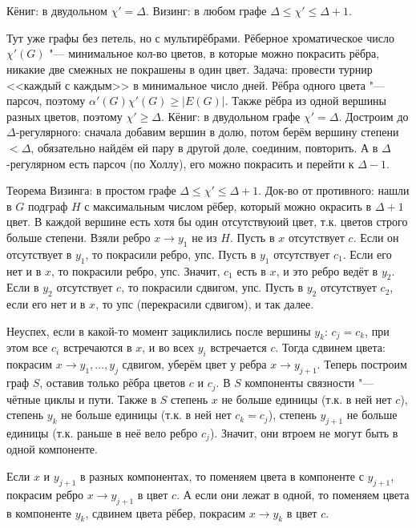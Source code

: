 \section{} %
	Кёниг: в двудольном $\chi'=\Delta$.
	Визинг: в любом графе $\Delta \le \chi' \le \Delta+1$.

	Тут уже графы без петель, но с мультирёбрами.
	Рёберное хроматическое число $\chi'(G)$ "--- минимальное кол-во цветов, в которые можно покрасить рёбра,
	никакие две смежных не покрашены в один цвет.
	Задача: провести турнир <<каждый с каждым>> в минимальное число дней.
	Рёбра одного цвета "--- парсоч, поэтому $\alpha'(G)\chi'(G) \ge |E(G)|$.
	Также рёбра из одной вершины разных цветов, поэтому $\chi' \ge \Delta$.
	Кёниг: в двудольном графе $\chi' = \Delta$.
	Достроим до $\Delta$-регулярного: сначала добавим вершин в долю, потом берём вершину степени $<\Delta$,
	обязательно найдём ей пару в другой доле, соединим, повторить.
	А в $\Delta$-регулярном есть парсоч (по Холлу), его можно покрасить и перейти к $\Delta-1$.

	Теорема Визинга: в простом графе $\Delta \le \chi' \le \Delta + 1$.
	Док-во от противного: нашли в $G$ подграф $H$ с максимальным числом рёбер, который можно окрасить в $\Delta+1$ цвет.
	В каждой вершине есть хотя бы один отсутствуюий цвет, т.к. цветов строго больше степени.
	Взяли ребро $x\to y_1$ не из $H$.
	Пусть в $x$ отсутствует $c$.
	Если он отсутствует в $y_1$, то покрасили ребро, упс.
	Пусть в $y_1$ отсутствует $c_1$.
	Если его нет и в $x$, то покрасили ребро, упс.
	Значит, $c_1$ есть в $x$, и это ребро ведёт в $y_2$.
	Если в $y_2$ отсутствует $c$, то покрасили сдвигом, упс.
	Пусть в $y_2$ отсутствует $c_2$, если его нет и в $x$, то упс (перекрасили сдвигом), и так далее.

	Неуспех, если в какой-то момент зациклились после вершины $y_k$: $c_j=c_k$, при этом все $c_i$ встречаются в $x$, и во всех $y_i$ встречается $c$.
	Тогда сдвинем цвета: покрасим $x \to y_1, \dots, y_{j}$ сдвигом, уберём цвет у ребра $x \to y_{j+1}$.
	Теперь построим граф $S$, оставив только рёбра цветов $c$ и $c_j$.
	В $S$ компоненты связности "--- чётные циклы и пути.
	Также в $S$ степень $x$ не больше единицы (т.к. в ней нет $c$), степень $y_k$ не больше единицы (т.к. в ней нет $c_k=c_j$),
	степень $y_{j+1}$ не больше единицы (т.к. раньше в неё вело ребро $c_j$).
	Значит, они втроем не могут быть в одной компоненте.

	Если $x$ и $y_{j+1}$ в разных компонентах, то поменяем цвета в компоненте с $y_{j+1}$, покрасим ребро $x\to y_{j+1}$ в цвет $c$.
	А если они лежат в одной, то поменяем цвета в компоненте $y_k$, сдвинем цвета рёбер, покрасим $x \to y_k$ в цвет $c$.

